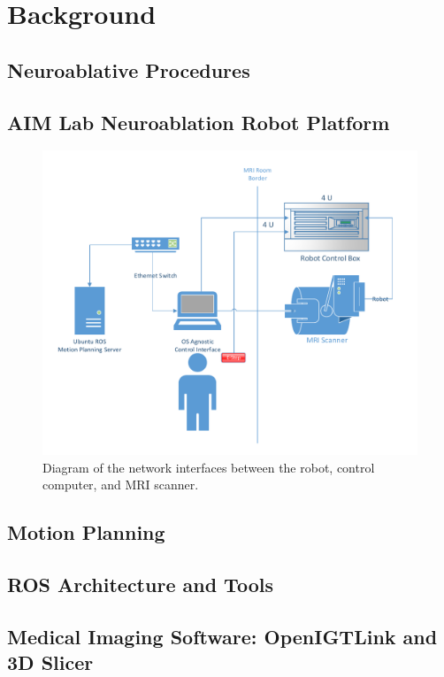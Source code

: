 \documentclass[12pt]{report}
\begin{document}
\chapter{Background}
\section{Neuroablative Procedures}
\section{AIM Lab Neuroablation Robot Platform}

\begin{figure}[thpb]
	\centering
	\includegraphics[width=\textwidth]{diagrams/Networking_Diagram.pdf}
    \caption{Diagram of the network interfaces between the robot, control computer, and MRI scanner. }
    \label{fig:networkDiagram}
\end{figure}

\section{Motion Planning}


\section{ROS Architecture and Tools}

\section{Medical Imaging Software: OpenIGTLink and 3D Slicer}
\end{document}
